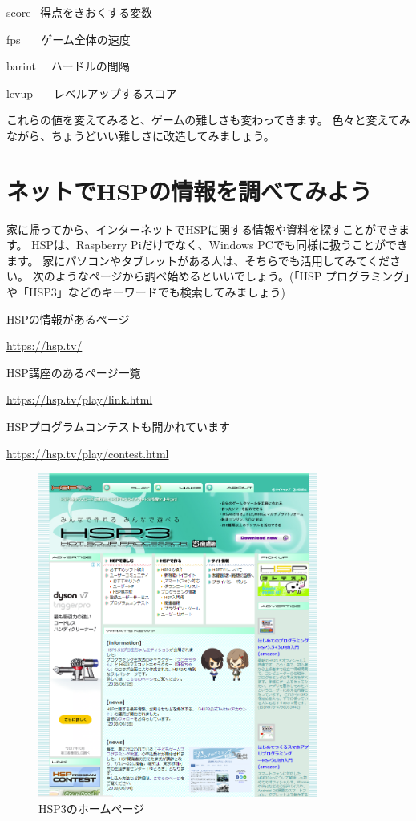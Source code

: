 \begin{description}
    \item score \ 得点をきおくする変数
    \item fps \ \ \ ゲーム全体の速度
    \item barint \ \ ハードルの間隔
    \item levup \ \ \ レベルアップするスコア
\end{description}

これらの値を変えてみると、ゲームの難しさも変わってきます。
色々と変えてみながら、ちょうどいい難しさに改造してみましょう。

\clearpage
\section{ネットでHSPの情報を調べてみよう}

家に帰ってから、インターネットでHSPに関する情報や資料を探すことができます。
HSPは、Raspberry Piだけでなく、Windows PCでも同様に扱うことができます。
家にパソコンやタブレットがある人は、そちらでも活用してみてください。
次のようなページから調べ始めるといいでしょう。(「HSP プログラミング」や「HSP3」などのキーワードでも検索してみましょう)

HSPの情報があるページ

\url{https://hsp.tv/}

HSP講座のあるページ一覧

\url{https://hsp.tv/play/link.html}

HSPプログラムコンテストも開かれています

\url{https://hsp.tv/play/contest.html}

\begin{figure}[H]
    \begin{center}
        \includegraphics[keepaspectratio,width=9.202cm,height=10.717cm]{text02-img/text02-img055.png}
        \caption{HSP3のホームページ}
    \end{center}
\end{figure}

